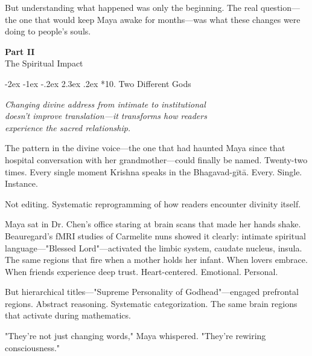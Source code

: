 \documentclass[12pt,twoside]{book}
\makeatletter
\def\cleardoublepage{\clearpage\if@twoside \ifodd\c@page\else\hbox{}\thispagestyle{empty}\newpage\if@twocolumn\hbox{}\newpage\fi\fi\fi}
\renewcommand\section{\@startsection{section}{1}{\z@}%
{-2ex \@plus -1ex \@minus -.2ex}%
{2.3ex \@plus.2ex}%
{\normalfont\Large\bfseries}}
\makeatother
\begin{document}
But understanding what happened was only the beginning. The real question—the one that would keep Maya awake for months—was what these changes were doing to people's souls.

\clearpage
\pagestyle{empty}
\vspace*{0.20\textheight}
\begin{center}
{\Huge\bfseries Part II}\\[0.5cm]
{\Large The Spiritual Impact}
\end{center}
\vspace*{\fill}
\cleardoublepage
\pagestyle{fancy}
\vspace*{0.20\textheight}
\section*{10. Two Different Gods}
\thispagestyle{chapterpage}

{\centering\itshape Changing divine address from intimate to institutional\\doesn't improve translation—it transforms how readers\\experience the sacred relationship.\par}
\vspace{0.3cm}

\normalfont\justifying
The pattern in the divine voice—the one that had haunted Maya since that hospital conversation with her grandmother—could finally be named. Twenty-two times. Every single moment Krishna speaks in the Bhagavad-gītā. Every. Single. Instance.

Not editing. Systematic reprogramming of how readers encounter divinity itself.

Maya sat in Dr. Chen's office staring at brain scans that made her hands shake. Beauregard's fMRI studies of Carmelite nuns showed it clearly: intimate spiritual language—"Blessed Lord"—activated the limbic system, caudate nucleus, insula. The same regions that fire when a mother holds her infant. When lovers embrace. When friends experience deep trust. Heart-centered. Emotional. Personal.

But hierarchical titles—"Supreme Personality of Godhead"—engaged prefrontal regions. Abstract reasoning. Systematic categorization. The same brain regions that activate during mathematics.

"They're not just changing words," Maya whispered. "They're rewiring consciousness."
\end{document}
